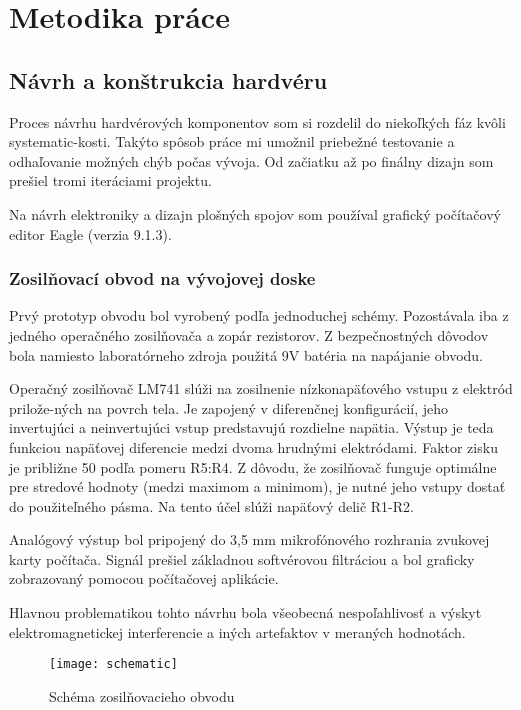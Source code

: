 \documentclass[titlepage,12pt]{article}
\begin{document}
\newpage
\section{Metodika práce}
\subsection{Návrh a konštrukcia hardvéru}
Proces návrhu hardvérových komponentov som si rozdelil do niekoľkých fáz kvôli systematic-kosti. Takýto spôsob práce mi umožnil priebežné testovanie a odhaľovanie možných chýb počas vývoja. Od začiatku až po finálny dizajn som prešiel tromi iteráciami projektu. 

Na návrh elektroniky a dizajn plošných spojov som používal grafický počítačový editor \linebreak Eagle (verzia 9.1.3).

\subsubsection{Zosilňovací obvod na vývojovej doske}
Prvý prototyp obvodu bol vyrobený podľa jednoduchej schémy. Pozostávala iba z jedného operačného zosilňovača a zopár rezistorov. Z bezpečnostných dôvodov bola namiesto laboratórneho zdroja použitá 9V batéria na napájanie obvodu. 

Operačný zosilňovač LM741 slúži na zosilnenie nízkonapäťového vstupu z elektród prilože-ných na povrch tela. Je zapojený v diferenčnej konfigurácií, jeho invertujúci a neinvertujúci vstup predstavujú rozdielne napätia. Výstup je teda funkciou napäťovej diferencie medzi dvoma hrudnými elektródami. Faktor zisku je približne 50 podľa pomeru R5:R4. Z dôvodu, že zosilňovač funguje optimálne pre stredové hodnoty (medzi maximom a minimom), je nutné jeho vstupy dostať do použiteľného pásma. Na tento účel slúži napäťový delič R1-R2.

Analógový výstup bol pripojený do 3,5 mm mikrofónového rozhrania zvukovej karty počítača. Signál prešiel základnou softvérovou filtráciou a bol graficky zobrazovaný pomocou počítačovej aplikácie.

Hlavnou problematikou tohto návrhu bola všeobecná nespoľahlivosť a výskyt elektromagnetickej interferencie a iných artefaktov v meraných hodnotách.


\begin{figure}[!ht]
\begin{center}
\texttt{[image: schematic]}
\caption{Schéma zosilňovacieho obvodu}
\end{center}
\end{figure}
\end{document}

